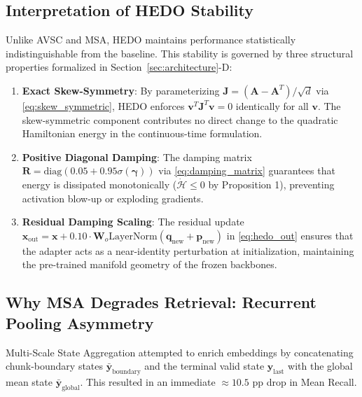 \documentclass[10pt,journal,final]{IEEEtran}
\begin{document}
\subsection{Interpretation of HEDO Stability}
Unlike AVSC and MSA, HEDO maintains performance statistically indistinguishable from the baseline. This stability is governed by three structural properties formalized in Section~\ref{sec:architecture}-D:
\begin{enumerate}
    \item \textbf{Exact Skew-Symmetry}: By parameterizing $\mathbf{J} = (\mathbf{A} - \mathbf{A}^T)/\sqrt{d}$ via \eqref{eq:skew_symmetric}, HEDO enforces $\mathbf{v}^T \mathbf{J}^T \mathbf{v} = 0$ identically for all $\mathbf{v}$. The skew-symmetric component contributes no direct change to the quadratic Hamiltonian energy in the continuous-time formulation.
    \item \textbf{Positive Diagonal Damping}: The damping matrix $\mathbf{R} = \mathrm{diag}(0.05 + 0.95\sigma(\boldsymbol{\gamma}))$ via \eqref{eq:damping_matrix} guarantees that energy is dissipated monotonically ($\dot{\mathcal{H}} \le 0$ by Proposition 1), preventing activation blow-up or exploding gradients.
    \item \textbf{Residual Damping Scaling}: The residual update $\mathbf{x}_{\mathrm{out}} = \mathbf{x} + 0.10 \cdot \mathbf{W}_o \mathrm{LayerNorm}(\mathbf{q}_{\mathrm{new}} + \mathbf{p}_{\mathrm{new}})$ in \eqref{eq:hedo_out} ensures that the adapter acts as a near-identity perturbation at initialization, maintaining the pre-trained manifold geometry of the frozen backbones.
\end{enumerate}

\subsection{Why MSA Degrades Retrieval: Recurrent Pooling Asymmetry}
Multi-Scale State Aggregation attempted to enrich embeddings by concatenating chunk-boundary states $\bar{\mathbf{y}}_{\mathrm{boundary}}$ and the terminal valid state $\mathbf{y}_{\mathrm{last}}$ with the global mean state $\bar{\mathbf{y}}_{\mathrm{global}}$. This resulted in an immediate $\approx 10.5$ pp drop in Mean Recall.
\end{document}
